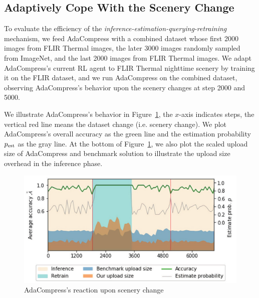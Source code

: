 \subsection{Adaptively Cope With the Scenery Change}

To evaluate the efficiency of the \emph{inference-estimation-querying-retraining} mechanism, we feed AdaCompress with a combined dataset whose first 2000 images from FLIR Thermal images, the later 3000 images randomly sampled from ImageNet, and the last 2000 images from FLIR Thermal images. We adapt AdaCompress's current RL agent to FLIR Thermal nighttime scenery by training it on the FLIR dataset, and we run AdaCompress on the combined dataset, observing AdaCompress's behavior upon the scenery changes at step 2000 and 5000. %

We illustrate AdaCompress's behavior in Figure~\ref{fig: running-retrain}, the $ x $-axis indicates steps, the vertical red line means the dataset change (i.e. scenery change). We plot AdaCompress's overall accuracy as the green line and the estimation probability $ p_{\rm est} $ as the gray line. At the bottom of Figure~\ref{fig: running-retrain}, we also plot the scaled upload size of AdaCompress and benchmark solution to illustrate the upload size overhead in the inference phase.

\begin{figure}[H]
    \includegraphics[width=\linewidth]{figures/running-retrain.pdf}
    \caption{AdaCompress's reaction upon scenery change}
    \label{fig: running-retrain}
\end{figure}

